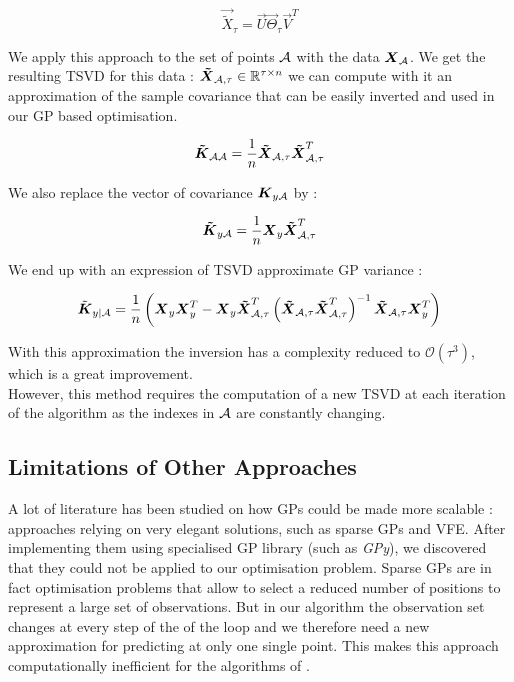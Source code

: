 \begin{equation}
	\vec{\tilde{X}}_\tau = \vec{U} \vec{\Theta}_\tau \vec{V}^T
\end{equation}


We apply this approach to the set of points $\mathcal{A}$ with the data ${\boldsymbol{{X}}}_{\mathcal{A}}$. We get the resulting TSVD for this data : ${\boldsymbol{{\tilde{X}}}}_{\mathcal{A},\tau} \in \mathbb{R}^{\tau \times n}$ we can compute with it an approximation of the sample covariance that can be easily inverted and used in our GP based optimisation.

\begin{equation}
	{\boldsymbol{{\tilde{K}}}}_{\mathcal{A}\mathcal{A}} = \frac{1}{n}{\boldsymbol{{\tilde{X}}}}_{\mathcal{A},\tau}  {\boldsymbol{{\tilde{X}}}}_{\mathcal{A},\tau}^T
\end{equation}

We also replace the vector of covariance ${\boldsymbol{{K}}}_{y\mathcal{A}}$ by : 

\begin{equation}
	{\boldsymbol{{\tilde{K}}}}_{y\mathcal{A}} =  \frac{1}{n}{\boldsymbol{{X}}}_{y} {\boldsymbol{{\tilde{X}}}}_{\mathcal{A},\tau}^T
\end{equation}

We end up with an expression of TSVD approximate GP variance : 

\begin{equation}
	\tilde{{\boldsymbol{{K}}}}_{y | \mathcal{A}} =  \frac{1}{n} \left( {\boldsymbol{{X}}}_{y}{\boldsymbol{{X}}}_{y}^T - {\boldsymbol{{X}}}_{y} {\boldsymbol{{\tilde{X}}}}_{\mathcal{A},\tau}^T \left({\boldsymbol{{\tilde{X}}}}_{\mathcal{A},\tau}  {\boldsymbol{{\tilde{X}}}}_{\mathcal{A},\tau}^T \right)^{-1}  {\boldsymbol{{\tilde{X}}}}_{\mathcal{A},\tau} {\boldsymbol{{X}}}_{y}^T \right)
\end{equation}

With this approximation the inversion has a complexity reduced to $\mathcal{O}(\tau^3)$, which is a great improvement. \\

 However, this method requires the computation of a new TSVD at each iteration of the algorithm as the indexes in $\mathcal{A}$ are constantly changing. 
 

\subsection{Limitations of Other Approaches}

A lot of literature has been studied on how GPs could be made more scalable : approaches relying on very elegant solutions, such as sparse GPs and VFE. After implementing them using specialised GP library (such as \textit{GPy}), we discovered that they could not be applied to our optimisation problem. Sparse GPs are in fact optimisation problems that allow to select a reduced number of positions to represent a large set of observations. But in our algorithm the observation set changes at every step of the of the loop and we therefore need a new approximation for predicting at only one single point. This makes this approach computationally inefficient for the algorithms of \citet{krause_near-optimal_2008}. \\

